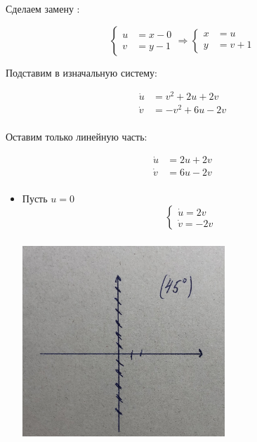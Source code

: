 \documentclass[12pt]{article}
\begin{document}
\begin{itemize}
\begin{itemize}
Сделаем замену :

\[
\left\{
\begin{aligned}
u &= x - 0 \\
v &= y - 1
\end{aligned}
\right.
\Rightarrow
\left\{
\begin{aligned}
x &= u \\
y &= v + 1
\end{aligned}
\right.
\]

Подставим в изначальную систему:

\[
\begin{aligned}
\dot{u} &= v^2 + 2u + 2v \\
\dot{v} &= -v^2 + 6u - 2v \\
\end{aligned}
\]

Оставим только линейную часть:

\[
\begin{aligned}
\dot{u} &= 2u + 2v \\
\dot{v} &= 6u - 2v \\
\end{aligned}
\]

\begin{itemize}
\item Пусть $u = 0$
        \[
\begin{cases}
\dot{u} = 2v \\
\dot{v} = -2v
\end{cases}
\]
\begin{center}
\includegraphics[width=3in,height=3in]{system_one_for_zerou_5.jpeg}
\end{center}


\end{itemize}
\end{itemize}
\end{itemize}
\end{document}
